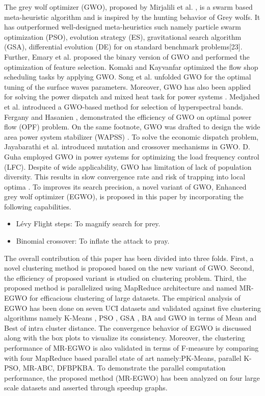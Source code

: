 \documentclass[review]{elsarticle}
\begin{document}
The grey wolf optimizer (GWO), proposed by Mirjalili et al. \cite{mirjalili2014grey}, is a swarm based meta-heuristic algorithm and is inspired by the hunting behavior of Grey wolfs. It has outperformed well-designed meta-heuristics such namely particle swarm optimization (PSO), evolution strategy (ES), gravitational search algorithm (GSA), differential evolution (DE) for on standard benchmark problems[23]. Further, Emary et al. \cite{emary2016binary} proposed the binary version of GWO and performed the optimization of feature selection. Komaki and Kayvanfar \cite{komaki2015grey} optimized the flow shop scheduling tasks by applying GWO. Song et al. \cite{el2015single} unfolded GWO for the optimal tuning of the surface waves parameters. Moreover, GWO has also been applied for solving the power dispatch and mixed heat task for power systems \cite{jayakumar2016grey}. Medjahed et al. \cite{medjahed2016gray} introduced a GWO-based method for selection of hyperspectral bands. Fergany and Hasanien \cite{ho2002simple}, demonstrated the efficiency of GWO on optimal power flow (OPF) problem. On the same footnote, GWO was drafted to design the wide area power system stabilizer (WAPSS) \cite{shakarami2016wide}. To solve the economic dispatch problem, Jayabarathi et al. \cite{jayabarathi2016economic} introduced mutation and crossover mechanisms in GWO. D. Guha \cite{guha2016load} employed GWO in power systems for optimizing the load frequency control (LFC). 
   Despite of wide applicability, GWO has limitation of lack of population diversity. This results in slow convergence rate and risk of trapping into local optima \cite{zhang2015grey}. To improves its search precision, a novel variant of GWO, Enhanced grey wolf optimizer (EGWO), is proposed in this paper by incorporating the following capabilities. 
\begin{itemize}
\item  L\'{e}vy Flight steps: To magnify search for prey.
\item Binomial crossover: To inflate the attack to pray. 
\end{itemize}
  The overall contribution of this paper has been divided into three folds. First, a novel clustering method is proposed based on the new variant of GWO. Second, the efficiency of proposed variant is studied on clustering problem. Third, the proposed method is parallelized using MapReduce architecture and named MR-EGWO for efficacious clustering of large datasets. The empirical analysis of EGWO has been done on seven UCI datasets and validated against five clustering algorithms namely K-Means \cite{xu2005}, PSO \cite{alam2008particle}, GSA \cite{hatamlou2012combined}, BA \cite{ashish2018parallel} and GWO \cite{kumar2017grey} in terms of Mean and Best of intra cluster distance. The convergence behavior of EGWO is discussed along with the box plots to visualize its consistency. Moreover, the clustering performance of MR-EGWO is also validated in terms of F-measure by comparing with four MapReduce based parallel state of art namely:PK-Means, parallel K-PSO, MR-ABC, DFBPKBA. To demonstrate the parallel computation performance, the proposed method (MR-EGWO) has been analyzed on four large scale datasets and asserted through speedup graphs.
\end{document}
